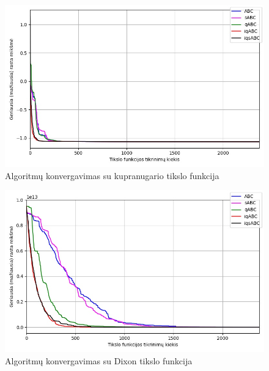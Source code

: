 \documentclass{VUMIFKompMagistrinis}
\begin{document}
\begin{landscape}
\begin{multicols}{2}
\end{multicols}
\begin{multicols}{2}

\begin{figure}[H]
    \centering
    \includegraphics[scale=0.45]{img/2kv/all_camel.jpg}
     \caption{Algoritmų konvergavimas su kupranugario tikslo funkcija}
    \label{img:kon3}
\end{figure}

\begin{figure}[H]
    \centering
    \includegraphics[scale=0.45]{img/2kv/all_dixon.jpg}
     \caption{Algoritmų konvergavimas su Dixon tikslo funkcija}
    \label{img:kon4}
\end{figure}

\end{multicols}\newpage
\begin{multicols}{2}


\end{multicols}
\end{landscape}
\end{document}
